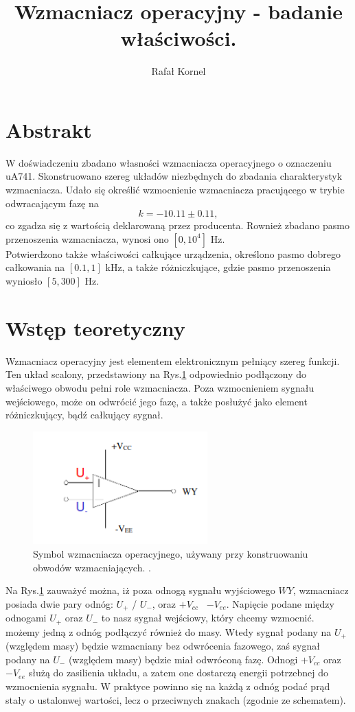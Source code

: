 \documentclass[11pt,a4paper]{article}
\author{Rafał Kornel}
\title{\textbf{Wzmacniacz operacyjny - badanie właściwości.}}
\date{}
\begin{document}
\maketitle

\section*{Abstrakt}
W doświadczeniu zbadano własności wzmacniacza operacyjnego o oznaczeniu uA741. Skonstruowano szereg układów niezbędnych do zbadania charakterystyk wzmacniacza. Udało się określić wzmocnienie wzmacniacza pracującego w trybie odwracającym fazę na 
$$ k = -10.11 \pm 0.11, $$
co zgadza się z wartością deklarowaną przez producenta. Rownież zbadano pasmo przenoszenia wzmacniacza, wynosi ono $[0, 10^4]$ Hz.  \\
Potwierdzono także właściwości całkujące urządzenia, określono pasmo dobrego całkowania na $[0.1, 1]$ kHz, a także różniczkujące, gdzie pasmo przenoszenia wyniosło $[5, 300]$ Hz.

\section*{Wstęp teoretyczny}
Wzmacniacz operacyjny jest elementem elektronicznym pełniący szereg funkcji. Ten układ scalony, przedstawiony na Rys.\ref{wzmacniacz1} odpowiednio podłączony do właściwego obwodu pełni role wzmacniacza. Poza wzmocnieniem sygnału wejściowego, może on odwrócić jego fazę, a także posłużyć jako element różniczkujący, bądź całkujący sygnał.
\begin{figure}[ht!]	
	\begin{center}
		\includegraphics[width = 0.6\textwidth]{schemat_wzmacniacza.png}
		\caption{Symbol wzmacniacza operacyjnego, używany przy konstruowaniu obwodów wzmacniających. \cite{wzmacniacz}.}
		\label{wzmacniacz1}
	\end{center}
\end{figure}	
Na Rys.\ref{wzmacniacz1} zauważyć można, iż poza odnogą sygnału wyjściowego $WY$, wzmacniacz posiada dwie pary odnóg: $U_+$ / $U_-$, oraz $+V_{cc}$ \ $-V_{ee}$. Napięcie podane między odnogami $U_+$ oraz $U_-$ to nasz sygnał wejściowy, który chcemy wzmocnić. możemy jedną z odnóg podłączyć również do masy. Wtedy sygnał podany na $U_+$ (względem masy) będzie wzmacniany bez odwrócenia fazowego, zaś sygnał podany na $U_-$ (względem masy) będzie miał odwróconą fazę. Odnogi $+V_{cc}$ oraz $-V_{ee}$ służą do zasilienia układu, a zatem one dostarczą energii potrzebnej do wzmocnienia sygnału. W praktyce powinno się na każdą z odnóg podać prąd stały o ustalonwej wartości, lecz o przeciwnych znakach (zgodnie ze schematem).
\end{document}
